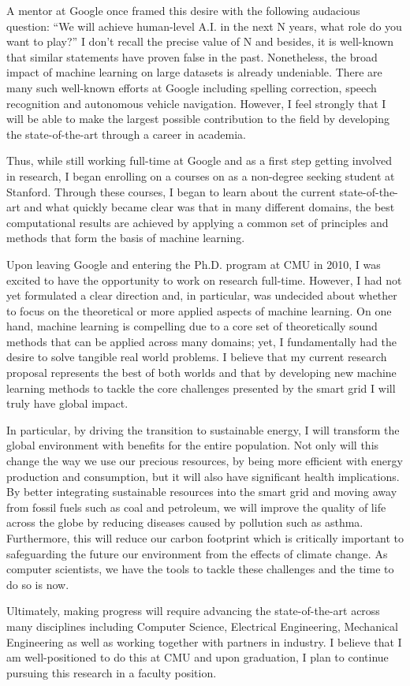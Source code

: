 \documentclass[12pt]{article}
\begin{document}
A mentor at Google once framed this desire with the following audacious question: ``We will achieve human-level A.I. in the next N years, what role do you want to play?'' I don't recall the precise value of N  and besides, it is well-known that similar statements have proven false in the past. Nonetheless, the broad impact of machine learning on large datasets is already undeniable. There are many such well-known efforts at Google including spelling correction, speech recognition and autonomous vehicle navigation. However, I feel strongly that I will be able to make the largest possible contribution to the field by developing the state-of-the-art through a career in academia.

Thus, while still working full-time at Google and as a first step getting involved in research, I began enrolling on a courses on as a non-degree seeking student at Stanford. Through these courses, I began to learn about the current state-of-the-art and what quickly became clear was that in many different domains, the best computational results are achieved by applying a common set of principles and methods that form the basis of machine learning.

Upon leaving Google and entering the Ph.D. program at CMU in 2010, I was excited to have the opportunity to work on research full-time. However, I had not yet formulated a clear direction and, in particular, was undecided about whether to focus on the theoretical or more applied aspects of machine learning. On one hand, machine learning is compelling due to a core set of theoretically sound methods that can be applied across many domains; yet, I fundamentally had the desire to solve tangible real world problems. I believe that my current research proposal represents the best of both worlds and that by developing new machine learning methods to tackle the core challenges presented by the smart grid I will truly have global impact.

In particular, by driving the transition to sustainable energy, I will transform the global environment with benefits for the entire population. Not only will this change the way we use our precious resources, by being more efficient with energy production and consumption, but it will also have significant health implications. By better integrating sustainable resources into the smart grid and moving away from fossil fuels such as coal and petroleum, we will improve the quality of life across the globe by reducing diseases caused by pollution such as asthma. Furthermore, this will reduce our carbon footprint which is critically important to safeguarding the future our environment from the effects of climate change. As computer scientists, we have the tools to tackle these challenges and the time to do so is now. 

Ultimately, making progress will require advancing the state-of-the-art across many disciplines including Computer Science, Electrical Engineering, Mechanical Engineering as well as working together with partners in industry. I believe that I am well-positioned to do this at CMU and upon graduation, I plan to continue pursuing this research in a faculty position.

\renewcommand{\refname}{\vskip -1.5cm}
\footnotesize


\end{document}
